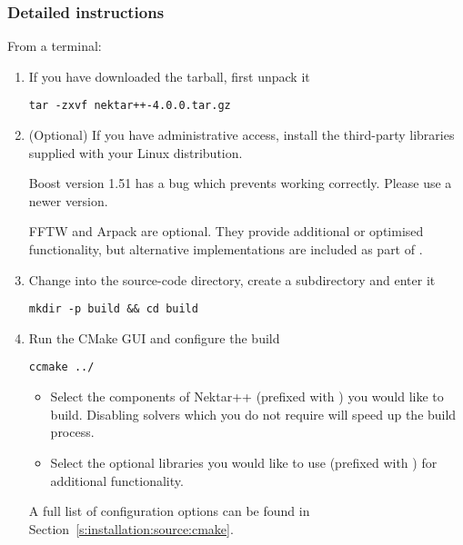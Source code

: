 \subsubsection{Detailed instructions}
From a terminal:
\begin{enumerate}
    \item If you have downloaded the tarball, first unpack it
    \begin{lstlisting}[style=BashInputStyle]
    tar -zxvf nektar++-4.0.0.tar.gz
    \end{lstlisting}
    
    \item (Optional) If you have administrative access, install the third-party
    libraries supplied with your Linux distribution.

    \begin{warningbox}
    Boost version 1.51 has a bug which prevents \nekpp working correctly.
    Please use a newer version.
    \end{warningbox}
    
    \begin{notebox}
    FFTW and Arpack are optional. They provide additional or optimised
    functionality, but alternative implementations are included as part of
    \nekpp.
    \end{notebox}

    \item Change into the source-code directory, create a 
    subdirectory and enter it 
    \begin{lstlisting}[style=BashInputStyle]
    mkdir -p build && cd build
    \end{lstlisting}
    
    \item Run the CMake GUI and configure the build
    \begin{lstlisting}[style=BashInputStyle]
    ccmake ../
    \end{lstlisting}
    \begin{itemize}
        \item Select the components of Nektar++ (prefixed with
        ) you would like to build. Disabling solvers
        which you do not require will speed up the build process.
        \item Select the optional libraries you would like to use (prefixed with
        ) for additional functionality.
    \end{itemize}
    A full list of configuration options can be found in
    Section~\ref{s:installation:source:cmake}.
    

\end{enumerate}
